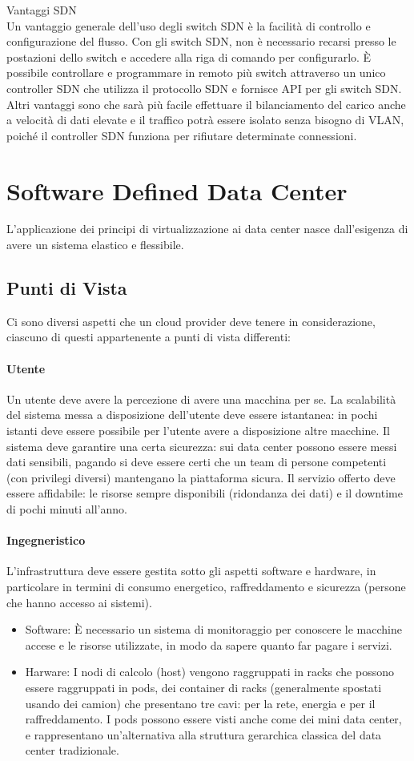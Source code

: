 \documentclass{article}
\begin{document}
		Vantaggi SDN\\
		Un vantaggio generale dell'uso degli switch SDN è la facilità di controllo e configurazione del flusso. Con gli switch SDN, non è necessario recarsi presso le postazioni dello switch e accedere alla riga di comando per configurarlo. 
		È possibile controllare e programmare in remoto più switch attraverso un unico controller SDN che utilizza il protocollo SDN e fornisce API per gli switch SDN. 
		Altri vantaggi sono che sarà più facile effettuare il bilanciamento del carico anche a velocità di dati elevate e il traffico potrà essere isolato senza bisogno di VLAN, poiché il controller SDN funziona per rifiutare determinate connessioni.
		
		\newpage
		\section{Software Defined Data Center}
		L'applicazione dei principi di virtualizzazione ai data center nasce dall'esigenza di avere un sistema elastico e flessibile.
		\subsection{Punti di Vista}
		Ci sono diversi aspetti che un cloud provider deve tenere in considerazione, ciascuno di questi appartenente a punti di vista differenti:
		\paragraph{Utente}
		Un utente deve avere la percezione di avere una macchina per se. La scalabilità del sistema messa a disposizione dell'utente deve essere istantanea: in pochi istanti deve essere possibile per l'utente avere a disposizione altre macchine. Il sistema deve garantire una certa sicurezza: sui data center possono essere messi dati sensibili, pagando si deve essere certi che un team di persone competenti (con privilegi diversi) mantengano la piattaforma sicura. Il servizio offerto deve essere affidabile: le risorse sempre disponibili (ridondanza dei dati) e il downtime di pochi minuti all'anno.\\
		\paragraph{Ingegneristico}
		L'infrastruttura deve essere gestita sotto gli aspetti software e hardware, in particolare in termini di consumo energetico, raffreddamento e sicurezza (persone che hanno accesso ai sistemi).
		\begin{itemize}
		    \item Software: È necessario un sistema di monitoraggio per conoscere le macchine accese e le risorse utilizzate, in modo da sapere quanto far pagare i servizi.
		    \item Harware: I nodi di calcolo (host) vengono raggruppati in racks che possono essere raggruppati in
		    pods, dei container di racks (generalmente spostati usando dei camion) che presentano tre cavi: 
		    per la rete, energia e per il raffreddamento. I pods possono essere visti anche come dei mini data center, e rappresentano un'alternativa alla struttura gerarchica classica del data center tradizionale.
		\end{itemize}
\end{document}

